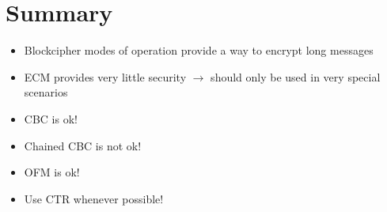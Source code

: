 \section{Summary}
	\begin{itemize}
		\item Blockcipher modes of operation provide a way to encrypt long messages
		\item ECM provides very little security $\rightarrow$ should only be used in very special scenarios
		\item CBC is ok!
		\item Chained CBC is not ok!
		\item OFM is ok!
		\item Use CTR whenever possible!
	\end{itemize}























